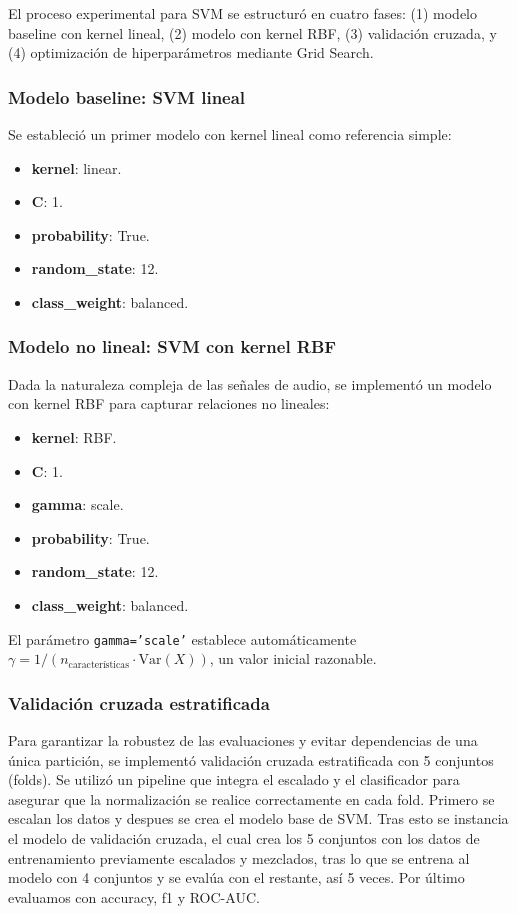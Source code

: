 El proceso experimental para SVM se estructuró en cuatro fases: (1) modelo baseline con kernel lineal, (2) modelo con kernel RBF, (3) validación cruzada, y (4) optimización de hiperparámetros mediante Grid Search.

\subsubsection*{Modelo baseline: SVM lineal}
Se estableció un primer modelo con kernel lineal como referencia simple:

\begin{itemize}
	\item \textbf{kernel}: linear.
	\item \textbf{C}: 1.
	\item \textbf{probability}: True.
	\item \textbf{random\_state}: 12.
	\item \textbf{class\_weight}: balanced.
\end{itemize}

\subsubsection*{Modelo no lineal: SVM con kernel RBF}
Dada la naturaleza compleja de las señales de audio, se implementó un modelo con kernel RBF para capturar relaciones no lineales:

\begin{itemize}
	\item \textbf{kernel}: RBF.
	\item \textbf{C}: 1.
	\item \textbf{gamma}: scale.
	\item \textbf{probability}: True.
	\item \textbf{random\_state}: 12.
	\item \textbf{class\_weight}: balanced.
\end{itemize}

El parámetro \texttt{gamma='scale'} establece automáticamente \(\gamma = 1/(n_{\text{características}} \cdot \text{Var}(X))\), un valor inicial razonable.

\subsubsection*{Validación cruzada estratificada}

Para garantizar la robustez de las evaluaciones y evitar dependencias de una única partición, se implementó validación cruzada estratificada con 5 conjuntos (folds). Se utilizó un pipeline que integra el escalado y el clasificador para asegurar que la normalización se realice correctamente en cada fold. Primero se escalan los datos y despues se crea el modelo base de SVM. Tras esto se instancia el modelo de validación cruzada, el cual crea los 5 conjuntos con los datos de entrenamiento previamente escalados y mezclados, tras lo que se entrena al modelo con 4 conjuntos y se evalúa con el restante, así 5 veces. Por último evaluamos con accuracy, f1 y ROC-AUC.

